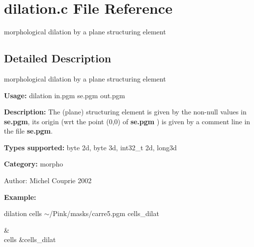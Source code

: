 \section{dilation.c File Reference}
\label{dilation_8c}
morphological dilation by a plane structuring element 



\subsection{Detailed Description}
morphological dilation by a plane structuring element 

{\bf Usage:} dilation in.pgm se.pgm out.pgm

{\bf Description:} The (plane) structuring element is given by the non-null values in {\bf se.pgm}, its origin (wrt the point (0,0) of {\bf se.pgm} ) is given by a comment line in the file {\bf se.pgm}.

{\bf Types supported:} byte 2d, byte 3d, int32\_\-t 2d, long3d

{\bf Category:} morpho

\begin{Desc}
\item[Author:]Michel Couprie 2002\end{Desc}
{\bf Example:}

dilation cells $\sim$/Pink/masks/carre5.pgm cells\_\-dilat

\begin{TabularC}{2}
\hline
 &  \\\hline
cells &cells\_\-dilat  \\\hline
\end{TabularC}
